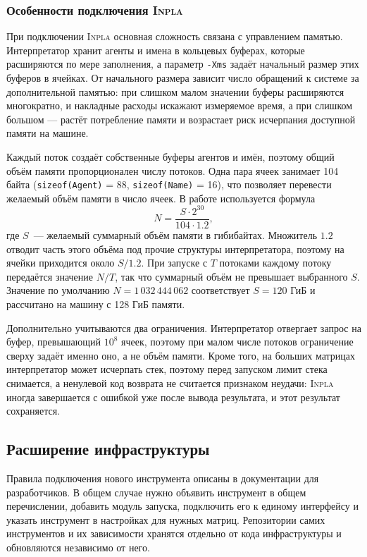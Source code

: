 \subsubsection{Особенности подключения \textsc{Inpla}}
\label{subsec:inpla}

При подключении \textsc{Inpla} основная сложность связана с управлением памятью. Интерпретатор хранит агенты и имена в кольцевых буферах, которые расширяются по мере заполнения, а параметр \texttt{-Xms} задаёт начальный размер этих буферов в ячейках. От начального размера зависит число обращений к системе за дополнительной памятью: при слишком малом значении буферы расширяются многократно, и накладные расходы искажают измеряемое время, а при слишком большом — растёт потребление памяти и возрастает риск исчерпания доступной памяти на машине.

Каждый поток создаёт собственные буферы агентов и имён, поэтому общий объём памяти пропорционален числу потоков. Одна пара ячеек занимает 104 байта (\texttt{sizeof(Agent)} = 88, \texttt{sizeof(Name)} = 16), что позволяет перевести желаемый объём памяти в число ячеек. В работе используется формула
\[
    N = \frac{S \cdot 2^{30}}{104 \cdot 1.2},
\]
где $S$~--- желаемый суммарный объём памяти в гибибайтах. Множитель $1.2$ отводит часть этого объёма под прочие структуры интерпретатора, поэтому на ячейки приходится около $S / 1.2$. При запуске с $T$ потоками каждому потоку передаётся значение $N / T$, так что суммарный объём не превышает выбранного $S$. Значение по умолчанию $N = 1\,032\,444\,062$ соответствует $S = 120$ ГиБ и рассчитано на машину с 128 ГиБ памяти.

Дополнительно учитываются два ограничения. Интерпретатор отвергает запрос на буфер, превышающий $10^8$ ячеек, поэтому при малом числе потоков ограничение сверху задаёт именно оно, а не объём памяти. Кроме того, на больших матрицах интерпретатор может исчерпать стек, поэтому перед запуском лимит стека снимается, а ненулевой код возврата не считается признаком неудачи: \textsc{Inpla} иногда завершается с ошибкой уже после вывода результата, и этот результат сохраняется.

\subsection{Расширение инфраструктуры}
\label{subsec:extensibility}

Правила подключения нового инструмента описаны в документации для разработчиков. В общем случае нужно объявить инструмент в общем перечислении, добавить модуль запуска, подключить его к единому интерфейсу и указать инструмент в настройках для нужных матриц. Репозитории самих инструментов и их зависимости хранятся отдельно от кода инфраструктуры и обновляются независимо от него.
